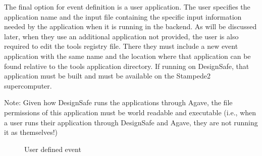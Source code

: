 The final option for event definition is a user application. 
The user specifies the application name and the input file containing the specific input information 
needed by the application when it is running in the backend. 
As will be discussed later, when they use an additional application not provided, the user is also required 
to edit the tools registry file. There they must include a new event application with the same name 
and the location where that application can be found relative to the tools application directory. 
If running on DesignSafe, that application must be built and must be available on the Stampede2 supercomputer. 

Note: Given how DesignSafe runs the applications through Agave, the file permissions of this application must be 
world readable and executable (i.e., when a user runs their application through DesignSafe and Agave, they are not running it as themselves!)

\begin{figure}[!htbp]
  \caption{User defined event}
  \label{fig:user_defined_event_panel}
\end{figure}
